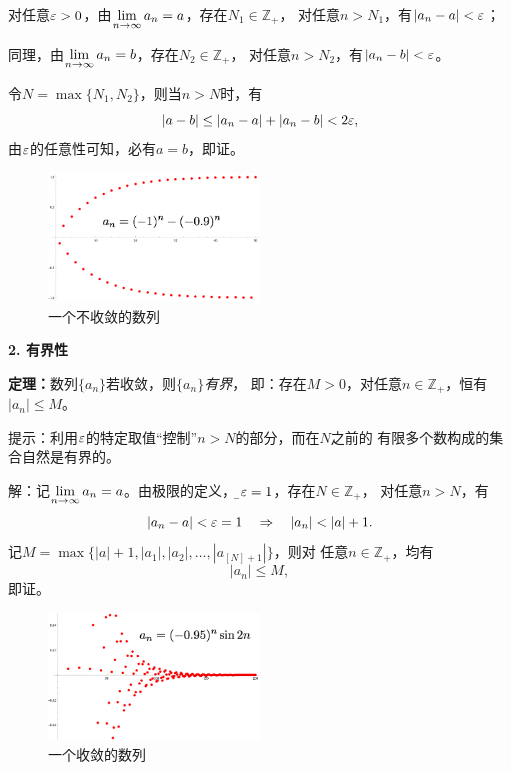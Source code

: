 对任意$\varepsilon>0$，由$\lim\limits_{n\to\infty} a_n=a$，存在$N_1\in\mathbb{Z}_+$，
对任意$n>N_1$，有$|a_n-a|<\varepsilon$；

同理，由$\lim\limits_{n\to\infty} a_n=b$，存在$N_2\in\mathbb{Z}_+$，
对任意$n>N_2$，有$|a_n-b|<\varepsilon$。

令$N=\max\{N_1,N_2\}$，则当$n>N$时，有
$$|a-b|\leq|a_n-a|+|a_n-b|<2\varepsilon,$$
由$\varepsilon$的任意性可知，必有$a=b$，即证。\fin

\begin{figure}[h]
	\centering
	\includegraphics[width=0.5\textwidth]{./Images/Ch01/1-0.9n.jpg}
	\caption{一个不收敛的数列}
	\label{fig:an-diverse}
\end{figure}

\bs
{\bf 2. 有界性}
\begin{thx}
	{\bf 定理：}数列$\{a_n\}$若收敛，则{\it $\{a_n\}$有界}，
	即：存在$M>0$，对任意$n\in\mathbb{Z}_+$，恒有$|a_n|\leq M$。	
\end{thx}

提示：利用$\varepsilon$的特定取值“控制”$n>N$的部分，而在$N$之前的
有限多个数构成的集合自然是有界的。

解：记$\lim\limits_{n\to\infty} a_n=a$。由极限的定义，对{\b$\varepsilon=1$}，存在$N\in\mathbb{Z}_+$，
对任意$n>N$，有
$$|a_n-a|<\e=1\quad\Rightarrow\quad |a_n|<|a|+1.$$
记$M=\max\{|a|+1,|a_1|,|a_2|,\ldots,|a_{[N]+1}|\}$，则对
任意$n\in\mathbb{Z}_+$，均有
$$|a_n|\leq M,$$
即证。\fin

\begin{figure}[h]
	\centering
	\includegraphics[width=0.5\textwidth]{./Images/Ch01/sin2nn.jpg}
	\caption{一个收敛的数列}
	\label{fig:an-converge}
\end{figure}

